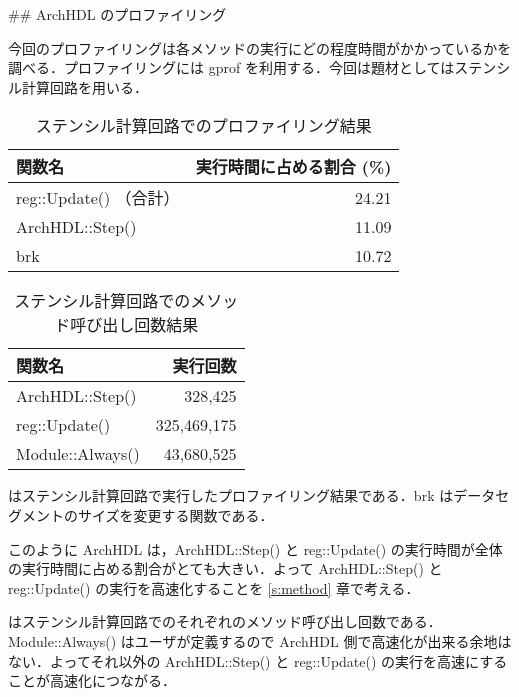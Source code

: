 ## ArchHDL のプロファイリング \label{ss:profiling}

今回のプロファイリングは各メソッドの実行にどの程度時間がかかっているかを調べる．プロファイリングには
gprof を利用する．今回は題材としてはステンシル計算回路を用いる．

\begin{table}[t]
 \caption{ステンシル計算回路でのプロファイリング結果}
 \label{table:stencil_prof}
 \begin{center}
  \begin{tabular}{lr} \toprule
  関数名 & 実行時間に占める割合 (\%) \\ \midrule
  reg::Update() （合計） & 24.21 \\
  ArchHDL::Step() & 11.09 \\
  brk & 10.72 \\ \bottomrule
  \end{tabular}
 \end{center}
\end{table}

\begin{table}[t]
 \caption{ステンシル計算回路でのメソッド呼び出し回数結果}
 \label{table:stencil_method_call_count}
 \begin{center}
  \begin{tabular}{lr} \toprule
  関数名 & 実行回数 \\ \midrule
  ArchHDL::Step()   &     328,425 \\
  reg::Update()     & 325,469,175 \\
  Module::Always()  &  43,680,525 \\ \bottomrule
  \end{tabular}
 \end{center}
\end{table}


 はステンシル計算回路で実行したプロファイリング結果である．brk はデータセグメントのサイズを変更する関数である．

このように ArchHDL は，ArchHDL::Step() と reg::Update() の実行時間が全体の実行時間に占める割合がとても大きい．よって ArchHDL::Step() と reg::Update() の実行を高速化することを \ref{s:method} 章で考える．

 はステンシル計算回路でのそれぞれのメソッド呼び出し回数である．Module::Always() はユーザが定義するので ArchHDL 側で高速化が出来る余地はない．よってそれ以外の ArchHDL::Step() と reg::Update() の実行を高速にすることが高速化につながる．



